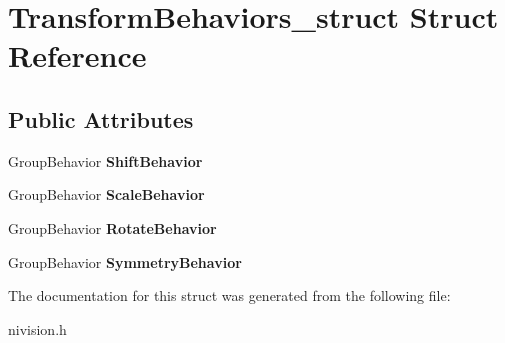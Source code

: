 \hypertarget{structTransformBehaviors__struct}{
\section{TransformBehaviors\_\-struct Struct Reference}
\label{structTransformBehaviors__struct}
}
\subsection*{Public Attributes}
\begin{DoxyCompactItemize}
\item 
\hypertarget{structTransformBehaviors__struct_a8e22bb385ce42ea44a92fe9b95450a02}{
GroupBehavior {\bfseries ShiftBehavior}}
\label{structTransformBehaviors__struct_a8e22bb385ce42ea44a92fe9b95450a02}

\item 
\hypertarget{structTransformBehaviors__struct_a470c01437e04d4d7f9324be1235ce5e5}{
GroupBehavior {\bfseries ScaleBehavior}}
\label{structTransformBehaviors__struct_a470c01437e04d4d7f9324be1235ce5e5}

\item 
\hypertarget{structTransformBehaviors__struct_a16025dbb991919688226e853f1ff9e62}{
GroupBehavior {\bfseries RotateBehavior}}
\label{structTransformBehaviors__struct_a16025dbb991919688226e853f1ff9e62}

\item 
\hypertarget{structTransformBehaviors__struct_a2d0c649ee887f6c1dccd57898997cf9b}{
GroupBehavior {\bfseries SymmetryBehavior}}
\label{structTransformBehaviors__struct_a2d0c649ee887f6c1dccd57898997cf9b}

\end{DoxyCompactItemize}


The documentation for this struct was generated from the following file:\begin{DoxyCompactItemize}
\item 
nivision.h\end{DoxyCompactItemize}
